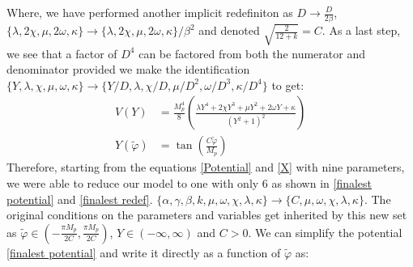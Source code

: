 \documentclass[aps,prd,reprint,preprintnumbers,showpacs,floatfix,nofootinbib,superscript address]{revtex4-2}
\begin{document}
Where, we have performed another implicit redefiniton as $D \rightarrow \frac{D}{2\beta}$, $ \{\lambda, 2\chi, \mu, 2\omega,  \kappa \} \rightarrow \{\lambda, 2\chi, \mu, 2\omega,  \kappa \} /\beta^2$ and denoted $\sqrt{\frac{2}{12+k}} = C$. As a last step, we see that a factor of $D^4$ can be factored from both the numerator and denominator provided we make the identification $\{Y, \lambda, \chi, \mu, \omega, \kappa \} \rightarrow \{Y/D, \lambda, \chi/D, \mu/D^2, \omega/D^3, \kappa/D^4 \}$ to get:
\begin{align}
    V(Y) &=  \frac{M_p^4}{8}  \left(\frac{\lambda Y^4 + 2 \chi Y^3 + \mu Y^2  + 2\omega Y + \kappa}{(Y^2 + 1)^2} \right) \label{finalest potential} \\
    Y(\tilde{\varphi}) &=  \tan \left(\frac{C \tilde{\varphi}}{M_p} \right) \label{finalest redef}
\end{align}
Therefore, starting from the equations \ref{Potential} and \ref{X} with nine parameters, we were able to reduce our model to one with only 6 as shown in \ref{finalest potential} and \ref{finalest redef}. $\{\alpha, \gamma,\beta, k , \mu, \omega, \chi, \lambda, \kappa\} \rightarrow \{C , \mu, \omega, \chi, \lambda, \kappa\}$. The original conditions on the parameters and variables get inherited by this new set as $\tilde{\varphi} \in (-\frac{\pi M_p}{2C},\frac{\pi M_p}{2C})$, $Y \in (-\infty,\infty)$ and $C > 0$. We can simplify the potential \ref{finalest potential} and write it directly as a function of $\tilde{\varphi}$ as:
\end{document}

